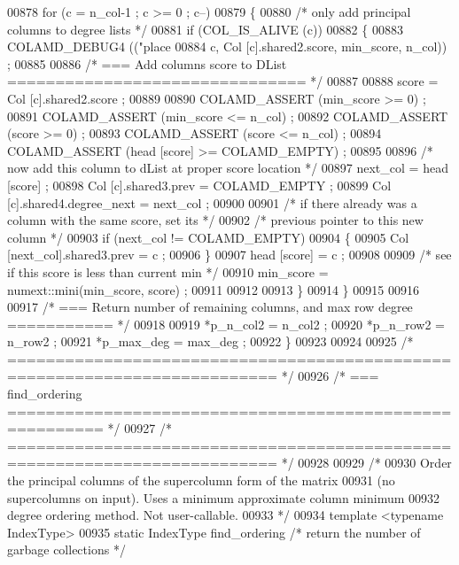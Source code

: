 \begin{DoxyCode}
{{{{{{{{{{{{{{{{00878   \textcolor{keywordflow}{for} (c = n\_col-1 ; c >= 0 ; c--)
00879   \{
00880     \textcolor{comment}{/* only add principal columns to degree lists */}
00881     \textcolor{keywordflow}{if} (COL\_IS\_ALIVE (c))
00882     \{
00883       COLAMD\_DEBUG4 ((\textcolor{stringliteral}{"place %
00884               c, Col [c].shared2.score, min\_score, n\_col)) ;
00885 
00886       \textcolor{comment}{/* === Add columns score to DList =============================== */}
00887 
00888       score = Col [c].shared2.score ;
00889 
00890       COLAMD\_ASSERT (min\_score >= 0) ;
00891       COLAMD\_ASSERT (min\_score <= n\_col) ;
00892       COLAMD\_ASSERT (score >= 0) ;
00893       COLAMD\_ASSERT (score <= n\_col) ;
00894       COLAMD\_ASSERT (head [score] >= COLAMD\_EMPTY) ;
00895 
00896       \textcolor{comment}{/* now add this column to dList at proper score location */}
00897       next\_col = head [score] ;
00898       Col [c].shared3.prev = COLAMD\_EMPTY ;
00899       Col [c].shared4.degree\_next = next\_col ;
00900 
00901       \textcolor{comment}{/* if there already was a column with the same score, set its */}
00902       \textcolor{comment}{/* previous pointer to this new column */}
00903       \textcolor{keywordflow}{if} (next\_col != COLAMD\_EMPTY)
00904       \{
00905     Col [next\_col].shared3.prev = c ;
00906       \}
00907       head [score] = c ;
00908 
00909       \textcolor{comment}{/* see if this score is less than current min */}
00910       min\_score = numext::mini(min\_score, score) ;
00911 
00912 
00913     \}
00914   \}
00915 
00916 
00917   \textcolor{comment}{/* === Return number of remaining columns, and max row degree =========== */}
00918 
00919   *p\_n\_col2 = n\_col2 ;
00920   *p\_n\_row2 = n\_row2 ;
00921   *p\_max\_deg = max\_deg ;
00922 \}
00923 
00924 
00925 \textcolor{comment}{/* ========================================================================== */}
00926 \textcolor{comment}{/* === find\_ordering ======================================================== */}
00927 \textcolor{comment}{/* ========================================================================== */}
00928 
00929 \textcolor{comment}{/*}
00930 \textcolor{comment}{  Order the principal columns of the supercolumn form of the matrix}
00931 \textcolor{comment}{  (no supercolumns on input).  Uses a minimum approximate column minimum}
00932 \textcolor{comment}{  degree ordering method.  Not user-callable.}
00933 \textcolor{comment}{*/}
00934 \textcolor{keyword}{template} <\textcolor{keyword}{typename} IndexType>
00935 \textcolor{keyword}{static} IndexType find\_ordering \textcolor{comment}{/* return the number of garbage collections */}
}}}}}}}}}}}}}}}}}
\end{DoxyCode}
